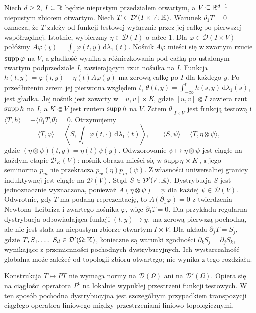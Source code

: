 \begin{uwaga}
\label{rem:limits20}
Niech $d\ge2$, $I\subseteq\mathbb R$ będzie niepustym przedziałem
otwartym, a $V\subseteq\mathbb R^{d-1}$ niepustym zbiorem otwartym.
Niech $T\in\mathcal D'(I\times V;\mathbb K)$.
Warunek $\partial_1T=0$ oznacza, że $T$ zależy od funkcji
testowej wyłącznie przez jej całkę po pierwszej współrzędnej.
Istotnie, wybierzmy $\eta\in\mathcal D(I)$ o całce $1$.
Dla $\varphi\in\mathcal D(I\times V)$ połóżmy
$A\varphi(y)=\int_I\varphi(t,y)\,\mathrm d\lambda_1(t)$.
Nośnik $A\varphi$ mieści się w zwartym rzucie
$\operatorname{supp}\varphi$ na $V$, a gładkość wynika z różniczkowania
pod całką po ustalonym zwartym podprzedziale $I$,
zawierającym rzut nośnika na $I$.
Funkcja $h(t,y)=\varphi(t,y)-\eta(t)A\varphi(y)$ ma zerową
całkę po $I$ dla każdego $y$.
Po przedłużeniu zerem jej pierwotna względem $t$,
$\theta(t,y)=\int_{-\infty}^t h(s,y)\,\mathrm d\lambda_1(s)$,
jest gładka. Jej nośnik jest zawarty w $[u,v]\times K$,
gdzie $[u,v]\Subset I$ zawiera rzut $\operatorname{supp} h$ na $I$,
a $K\Subset V$ jest rzutem $\operatorname{supp} h$ na $V$.
Zatem $\theta|_{I\times V}$ jest funkcją testową i
$\langle T,h\rangle=-\langle\partial_1T,\theta\rangle=0$.
Otrzymujemy
\[
\langle T,\varphi\rangle
=\left\langle S,\int_I\varphi(t,\cdot)\,\mathrm d\lambda_1(t)\right\rangle,
\qquad
\langle S,\psi\rangle=\langle T,\eta\otimes\psi\rangle,
\]
gdzie $(\eta\otimes\psi)(t,y)=\eta(t)\psi(y)$.
Odwzorowanie $\psi\mapsto\eta\otimes\psi$ jest ciągłe
na każdym etapie $\mathcal D_K(V)$: nośnik obrazu mieści
się w $\operatorname{supp}\eta\times K$, a jego seminorma $p_m$ nie
przekracza $p_m(\eta)p_m(\psi)$. Z własności uniwersalnej
granicy induktywnej jest ciągłe na $\mathcal D(V)$.
Stąd $S\in\mathcal D'(V;\mathbb K)$. Dystrybucja $S$ jest jednoznacznie wyznaczona,
ponieważ $A(\eta\otimes\psi)=\psi$ dla każdej $\psi\in\mathcal D(V)$.
Odwrotnie, gdy $T$ ma podaną reprezentację, to
$A(\partial_1\varphi)=0$ z twierdzenia Newtona--Leibniza
i zwartego nośnika $\varphi$, więc $\partial_1T=0$.
Dla przykładu regularna dystrybucja odpowiadająca funkcji
$(t,y)\mapsto y_1$ ma zerową pierwszą pochodną, ale
nie jest stała na niepustym zbiorze otwartym $I\times V$.
Dla układu $\partial_jT=S_j$, gdzie
$T,S_1,\ldots,S_d\in\mathcal D'(\Omega;\mathbb K)$, konieczne są warunki zgodności
$\partial_kS_j=\partial_jS_k$, wynikające z przemienności
pochodnych dystrybucyjnych. Ich wystarczalność globalna
może zależeć od topologii zbioru otwartego; nie wynika z tego
rozdziału.
\end{uwaga}

\begin{uwaga}
\label{rem:tvs-derivative20}
Konstrukcja $T\mapsto PT$ nie wymaga normy na
$\mathcal D(\Omega)$ ani na $\mathcal D'(\Omega)$.
Opiera się na ciągłości operatora $P^{\mathrm t}$ na
lokalnie wypukłej przestrzeni funkcji testowych.
W ten sposób pochodna dystrybucyjna jest szczególnym
przypadkiem transpozycji ciągłego operatora liniowego
między przestrzeniami liniowo-topologicznymi.
\end{uwaga}
